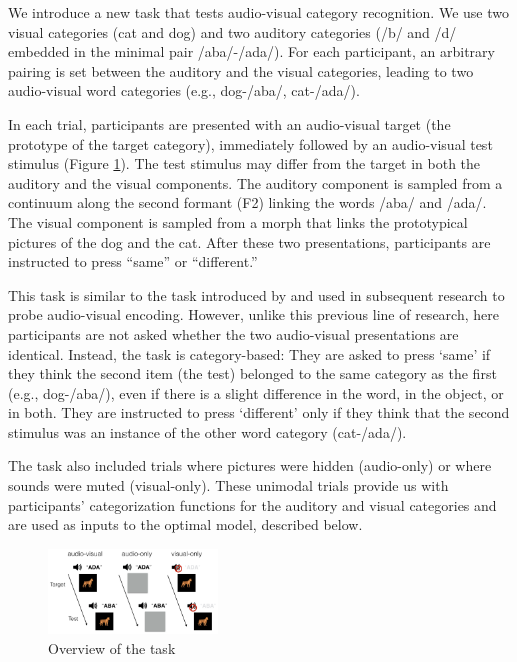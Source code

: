 \documentclass[10pt,letterpaper]{article}
\begin{document}
We introduce a new task that tests audio-visual category recognition. We use two visual categories (cat and dog) and two auditory categories (/b/ and /d/ embedded in the minimal pair /aba/-/ada/). For each participant, an arbitrary pairing is set between the auditory and the visual categories, leading to two audio-visual word categories (e.g., dog-/aba/, cat-/ada/).

In each trial, participants are presented with an audio-visual target (the prototype of the target category), immediately followed by an audio-visual test stimulus (Figure \ref{fig:task}). The test stimulus may differ from the target in both the auditory and the visual components. The auditory component is sampled from a continuum along the second formant (F2) linking the words /aba/ and /ada/. The visual component is sampled from a morph that links the prototypical pictures of the dog and the cat.  After these two presentations, participants are instructed to press ``same'' or ``different.''

This task is similar to the task introduced by  and used in subsequent research to probe audio-visual encoding. However, unlike this previous line of research, here participants are not asked whether the two audio-visual presentations are identical. Instead, the task is category-based: They are asked to press `same' if they think the second item (the test) belonged to the same category as the first (e.g.,  dog-/aba/), even if there is a slight difference in the word, in the object, or in both. They are instructed to press `different' only if they think that the second stimulus was an instance of the other word category (cat-/ada/).

The task also included trials where pictures were hidden (audio-only) or where sounds were muted (visual-only). These unimodal trials provide us with participants' categorization functions for the auditory and visual categories and are used as inputs to the optimal model, described below.

\begin{figure}[tp]
\centering
\includegraphics[width=0.4\textwidth]{task1.png}
\caption{Overview of the task}
\label{fig:task}
\end{figure}
\end{document}
